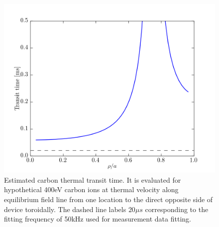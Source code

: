 \begin{refsection}
\begin{figure}
	\centering
	\includegraphics[width = 1.\linewidth]{./m0_and_impurity_heating/m0_transit_time.png}
	\caption[Estimated carbon thermal transit time]{Estimated carbon thermal transit time. It is evaluated for hypothetical 400eV carbon ions at thermal velocity along equilibrium field line from one location to the direct opposite side of device toroidally. The dashed line labels $20 \mu s$ corresponding to the fitting frequency of 50kHz used for measurement data fitting.}\label{fig:heat_travel_time}
\end{figure}


\end{refsection}
